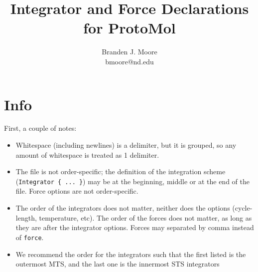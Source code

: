 \documentclass{article}
\title{Integrator and Force Declarations for ProtoMol}
\author{Branden J. Moore\\bmoore@nd.edu}
\begin{document}
\maketitle


\section{Info}
First, a couple of notes:
\begin{itemize}
\item Whitespace (including newlines) is a delimiter, but it is
grouped, so any amount of whitespace is treated as 1 delimiter.
\item The file is not order-specific; the definition of the
  integration scheme (\texttt{Integrator \{ ... \}}) may be at the
  beginning, middle or at the end of the file. Force options are not
  order-specific.
\item The order of the integrators does not matter, neither does the options
(cycle-length, temperature, etc).  The order of the forces does not matter,
as long as they are after the integrator options. Forces may separated
by comma instead of \texttt{force}.
\item We recommend the order for the integrators such that the first listed is
the outermost MTS, and the last one is the innermost STS integrators
\end{itemize}
\end{document}

